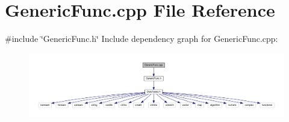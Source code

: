 \section{Generic\+Func.\+cpp File Reference}
\label{_generic_func_8cpp}
{\ttfamily \#include \char`\"{}Generic\+Func.\+h\char`\"{}}\newline
Include dependency graph for Generic\+Func.\+cpp\+:
\nopagebreak
\begin{figure}[H]
\begin{center}
\leavevmode
\includegraphics[width=350pt]{_generic_func_8cpp__incl}
\end{center}
\end{figure}
